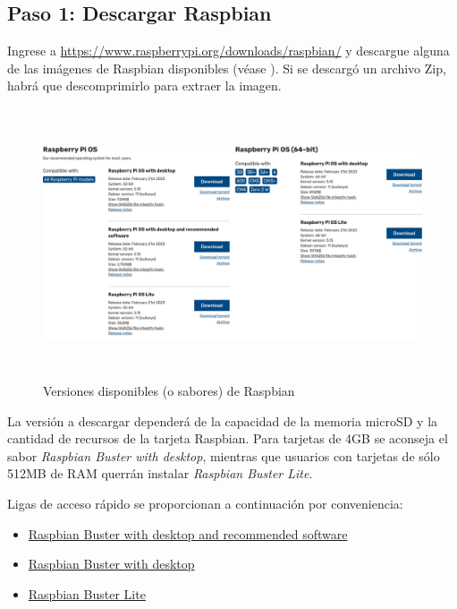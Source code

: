 \documentclass[letterpaper,10.5pt]{article}
\begin{document}
%
%
\subsection{Paso 1: Descargar Raspbian}%
\label{sec:step1}
Ingrese a \url{https://www.raspberrypi.org/downloads/raspbian/} y descargue alguna de las imágenes de Raspbian disponibles (véase ). Si se descargó un archivo Zip, habrá que descomprimirlo para extraer la imagen.

\begin{figure}
	\centering%
	\includegraphics[width=0.8\columnwidth,height=8cm,keepaspectratio]{img/p01-01.png} %
	\caption{Versiones disponibles (o sabores) de Raspbian}
	\label{fig:raspbian-flavors} %
\end{figure}

La versión a descargar dependerá de la capacidad de la memoria microSD y la cantidad de recursos de la tarjeta Raspbian.
Para tarjetas de 4GB se aconseja el sabor \emph{Raspbian Buster with desktop}, mientras que usuarios con tarjetas de sólo 512MB de RAM querrán instalar \emph{Raspbian Buster Lite}.

Ligas de acceso rápido se proporcionan a continuación por conveniencia:

\begin{itemize}[noitemsep]
	\item \href{https://downloads.raspberrypi.org/raspbian_full_latest}{Raspbian Buster with desktop and recommended software}
	\item \href{https://downloads.raspberrypi.org/raspbian_latest}{Raspbian Buster with desktop}
	\item \href{https://downloads.raspberrypi.org/raspbian_lite_latest}{Raspbian Buster Lite}
\end{itemize}
\end{document}
